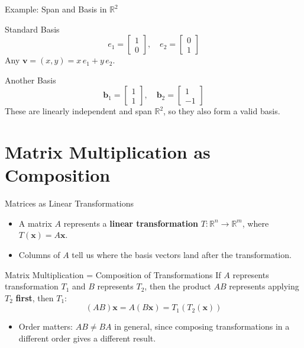 \documentclass[9pt,aspectratio=169]{beamer}
\newcommand{\R}{\mathbb{R}}
\newcommand{\vect}[1]{\mathbf{#1}}
\begin{document}
\begin{frame}{Example: Span and Basis in $\R^2$}
\begin{exampleblock}{Standard Basis}
$$e_1 = \begin{bmatrix}1\\0\end{bmatrix}, \quad e_2 = \begin{bmatrix}0\\1\end{bmatrix}$$
Any $\vect{v}=(x,y) = x\,e_1 + y\,e_2$.
\end{exampleblock}
\begin{exampleblock}{Another Basis}
$$\vect{b}_1=\begin{bmatrix}1\\1\end{bmatrix}, \quad \vect{b}_2 = \begin{bmatrix}1\\-1\end{bmatrix}$$
These are linearly independent and span $\R^2$, so they also form a valid basis.
\end{exampleblock}
\end{frame}

\section{Matrix Multiplication as Composition}

\begin{frame}{Matrices as Linear Transformations}
\begin{itemize}
\item A matrix $A$ represents a \textbf{linear transformation} $T:\R^n \to \R^m$, where $T(\vect{x}) = A\vect{x}$.
\item Columns of $A$ tell us where the basis vectors land after the transformation.
\end{itemize}
\begin{block}{Matrix Multiplication = Composition of Transformations}
If $A$ represents transformation $T_1$ and $B$ represents $T_2$, then the product $AB$ represents applying $T_2$ \textbf{first}, then $T_1$:
$$(AB)\vect{x} = A(B\vect{x}) = T_1(T_2(\vect{x}))$$
\end{block}
\begin{itemize}
\item Order matters: $AB \neq BA$ in general, since composing transformations in a different order gives a different result.
\end{itemize}
\end{frame}
\end{document}
